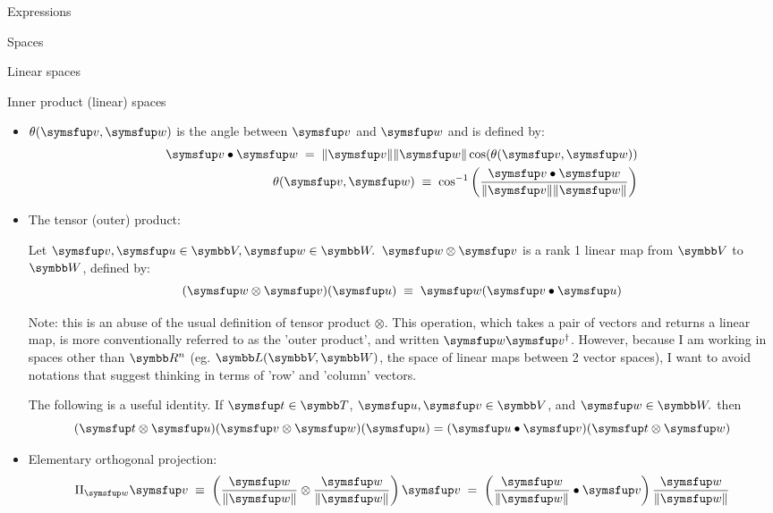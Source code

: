 \documentclass[12pt]{PalisadesLakesArticle}
\begin{document}
\begin{plSection}{Expressions}
\begin{plSection}{Spaces}
\begin{plSection}{Linear spaces}
\begin{plSection}{Inner product (linear) spaces}
\begin{itemize}
\item $\theta(\Vector{v},\Vector{w})$ is the angle between $\Vector{v}$ and $\Vector{w}$
and is defined by:
\begin{eqnarray}
\Vector{v} \bullet \Vector{w} \; = \; \| \Vector{v} \| \| \Vector{w} \| \cos(\theta(\Vector{v},\Vector{w}))
\\
\theta(\Vector{v},\Vector{w})
\; \equiv \;
\cos^{-1} \left(\frac{ \Vector{v} \bullet \Vector{w} }{\| \Vector{v} \| \| \Vector{w} \| } \right)
\nonumber
\end{eqnarray}

\item The tensor (outer) product:

Let $\Vector{v}, \Vector{u} \in \Space{V}, \Vector{w} \in \Space{W}.$
$\Vector{w} \otimes \Vector{v}$ is a rank 1 linear map
from $\Space{V}$ to $\Space{W}$, defined by:
\begin{equation}
(\Vector{w} \otimes \Vector{v})
(\Vector{u}) \; \equiv \; \Vector{w} 
(\Vector{v} \bullet \Vector{u})
\end{equation}

Note: this is an abuse of the usual definition of tensor product $\otimes$.
This operation, which takes a pair of vectors and returns a linear map,
is more conventionally referred to as the 'outer product',
and written $\Vector{w} \Vector{v}^{\dagger}$.
However, because I am working in spaces other than $\Reals^n$
(eg. $\Space{L}(\Space{V},\Space{W})$, the space of linear maps
between 2 vector spaces),
I want to avoid notations that suggest thinking in terms
of 'row' and 'column' vectors.

The following is a useful identity.
If $\Vector{t} \in \Space{T}$, 
$\Vector{u}, \Vector{v} \in \Space{V}$, 
and $\Vector{w} \in \Space{W}.$
then
\begin{equation}
\label{eq:tensor-dot}
(\Vector{t} \otimes \Vector{u}) 
(\Vector{v} \otimes \Vector{w})(\Vector{u}) 
= (\Vector{u} \bullet \Vector{v}) (\Vector{t} \otimes \Vector{w})
\end{equation}

\item Elementary orthogonal projection:
\begin{equation}
\Projection_{\Vector{w}} \Vector{v}
\; \equiv \;
\left( \frac{ \Vector{w} }{ \| \Vector{w} \| } \otimes 
\frac{ \Vector{w} }{ \| \Vector{w} \| } \right) \Vector{v}
\; = \;
\left(
\frac{\Vector{w} }{\|\Vector{w}\|} \bullet \Vector{v} 
\right) 
\frac{\Vector{w}}{\|\Vector{w}\|}
\end{equation}


\end{itemize}
\end{plSection}
\end{plSection}
\end{plSection}
\end{plSection}
\end{document}
